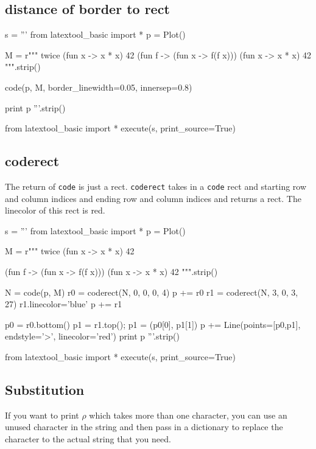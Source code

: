 \newpage
\subsection{distance of border to rect}

\begin{python}
s = '''
from latextool_basic import *
p = Plot()

M = r"""
twice (fun x -> x * x) 42
(fun f -> (fun x -> f(f x))) (fun x -> x * x) 42
""".strip()
    
code(p, M, border_linewidth=0.05, innersep=0.8)

print p
'''.strip()

from latextool_basic import *
execute(s, print_source=True)
\end{python}




\newpage
\subsection{coderect}

The return of \verb!code! is just a rect.
\verb!coderect! takes in a \verb!code! rect and
starting row and column indices and
ending row and column indices and returns a rect.
The linecolor of this rect is red.

\begin{python}
s = '''
from latextool_basic import *
p = Plot()

M = r"""
twice (fun x -> x * x) 42


(fun f -> (fun x -> f(f x))) (fun x -> x * x) 42
""".strip()
    
N = code(p, M)
r0 = coderect(N, 0, 0, 0, 4)
p += r0
r1 = coderect(N, 3, 0, 3, 27)
r1.linecolor='blue'
p += r1

p0 = r0.bottom()
p1 = r1.top(); p1 = (p0[0], p1[1])
p += Line(points=[p0,p1], endstyle='>', linecolor='red')
print p
'''.strip()

from latextool_basic import *
execute(s, print_source=True)
\end{python}




\newpage
\subsection{Substitution}

If you want to print $\rho$ which takes more than
one character, you can use an unused character in the string and then
pass in a dictionary to replace the character to the actual
string that you need.

